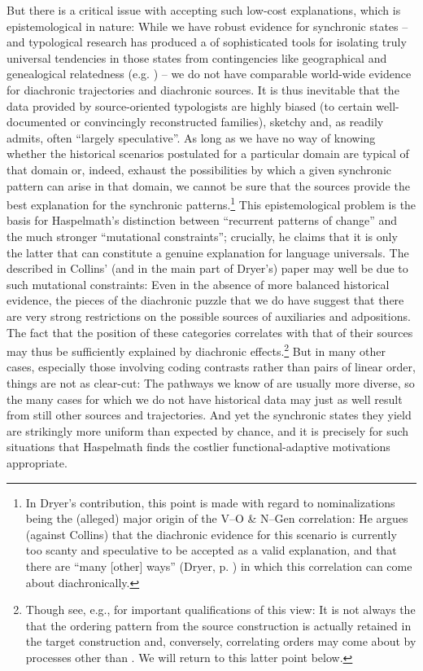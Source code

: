 \documentclass[output=paper]{langsci/langscibook}
\begin{document}
But there is a critical issue with accepting such low-cost explanations, which is epistemological in nature: While we have robust evidence for synchronic states – and typological research has produced a  of sophisticated tools for isolating truly universal tendencies in those states from contingencies like geographical and genealogical relatedness (e.g. \citealt{Bickel2013,Bickel2018,JaegerEtAl2011}) – we do not have comparable world-wide evidence for diachronic trajectories and diachronic sources. It is thus inevitable that the data provided by source-oriented typologists are highly biased (to certain well-documented or convincingly reconstructed families), sketchy and, as \citet[3]{Creissels2008} readily admits, often “largely speculative”. As long as we have no way of knowing whether the historical scenarios postulated for a particular domain are typical of that domain or, indeed, exhaust the possibilities by which a given synchronic pattern can arise in that domain, we cannot be sure that the sources provide the best explanation for the synchronic patterns.\footnote{In Dryer’s contribution, this point is made with regard to nominalizations being the (alleged) major origin of the V–O \& N–Gen correlation: He argues (against Collins) that the diachronic evidence for this scenario is currently too scanty and speculative to be accepted as a valid explanation, and that there are “many [other] ways” (Dryer, p. \pageref{p:dryer:manyotherways}) in which this correlation can come about diachronically.} 
\newpage
This epistemological problem is the basis for Haspelmath’s distinction between “recurrent patterns of change” and the much stronger “mutational constraints”; crucially, he claims that it is only the latter that can constitute a genuine explanation for language universals. The  described in Collins’ (and in the main part of Dryer’s) paper may well be due to such mutational constraints: Even in the absence of more balanced historical evidence, the pieces of the diachronic puzzle that we do have suggest that there are very strong restrictions on the possible sources of auxiliaries and adpositions. The fact that the position of these categories correlates with that of their sources may thus be sufficiently explained by diachronic  effects.\footnote{Though see, e.g., \citet[210--215]{Harris1995_Hist} for important qualifications of this view: It is not always the  that the ordering pattern from the source construction is actually retained in the target construction and, conversely, correlating orders may come about by processes other than . We will return to this latter point below.} But in many other cases, especially those involving coding contrasts rather than pairs of linear order, things are not as clear-cut: The pathways we know of are usually more diverse, so the many cases for which we do not have historical data may just as well result from still other sources and trajectories. And yet the synchronic states they yield are strikingly more uniform than expected by chance, and it is precisely for such situations that Haspelmath finds the costlier functional-adaptive motivations appropriate.
\end{document}
